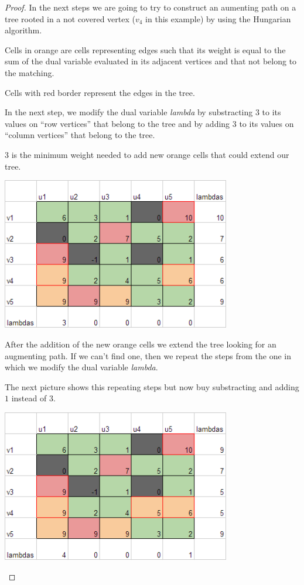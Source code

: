 \begin{proof}
    In the next steps we are going to try to construct an aumenting path on
    a tree rooted in a not covered vertex ($v_4$ in this example) by using
    the Hungarian algorithm.\pn
    
    Cells in orange are cells representing edges such that its weight is equal to the
    sum of the dual variable evaluated in its adjacent vertices and that
    not belong to the matching.\pn
    
    Cells with red border represent the edges in the tree.\pn
    
    In the next step, we modify the dual variable \textit{lambda} by substracting
    $3$ to its values on ``row vertices'' that belong to the tree and by adding
    $3$ to its values on ``column vertices'' that belong to the tree.\pn
    
    $3$ is the minimum weight needed to add new orange cells that could extend
    our tree.\pn
   
    \begin{center}
        \includegraphics[width=10cm]{Homework2/OptimumAssignment3.png}
    \end{center}\pn

    After the addition of the new orange cells we extend the tree looking for an
    augmenting path. If we can't find one, then we repeat the steps from the one
    in which we modify the dual variable \textit{lambda}. 
    
    The next picture shows this repeating steps but now buy substracting and adding $1$
    instead of $3$.

    \begin{center}
        \includegraphics[width=10cm]{Homework2/OptimumAssignment4.png}
    \end{center}\pn


\end{proof}
